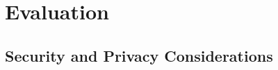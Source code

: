 \chapter{Evaluation}
\label{chap:Evaluation}

\section{Security and Privacy Considerations}










